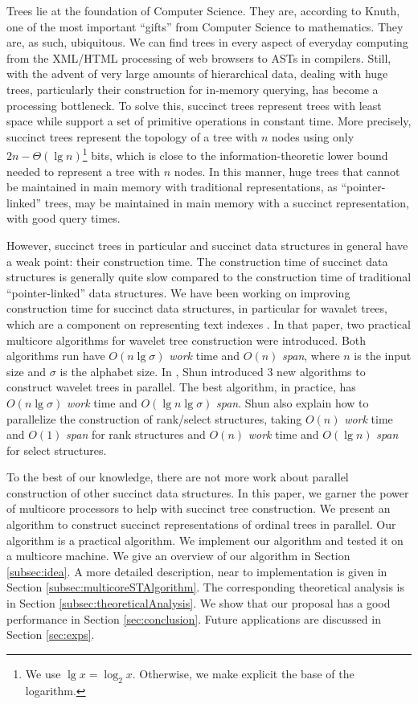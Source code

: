 Trees lie at the foundation of Computer Science. They are, according
to Knuth, one of the most important ``gifts'' from Computer Science to
mathematics. They are, as such, ubiquitous. We can find trees in every
aspect of everyday computing from the XML/HTML processing of web
browsers to ASTs in compilers. Still, with the advent of very large
amounts of hierarchical data, dealing with huge trees, particularly
their construction for in-memory querying, has become a processing
bottleneck. To solve this, succinct trees represent trees with least
space while support a set of primitive operations in constant time.
More precisely, succinct trees represent the topology of a tree with 
$n$ nodes using only $2n-\Theta(\lg n)$\footnote{We use $\lg x = \log_{2}x$. Otherwise, we make explicit the base of the logarithm.} bits, which is close to the
information-theoretic lower bound needed to represent a tree with $n$
nodes. In this manner, huge trees that cannot be maintained in main
memory with traditional representations, as ``pointer-linked'' trees,
may be maintained in main memory with a succinct representation, with good
query times.

However, succinct trees in particular and succinct data structures in general
have a weak point: their construction time. The construction time of succinct
data structures is generally quite slow compared to the construction time of
traditional ``pointer-linked'' data structures. We have been working
on improving construction time for succinct data structures, in particular
for wavalet trees, which are a component on representing text indexes
\cite{Fuentes2014}. In that paper, two practical multicore algorithms
for wavelet tree construction were introduced. Both algorithms run
have $O(n\lg \sigma)$ {\em work} time and $O(n)$ {\em span}, where $n$
is the input size and $\sigma$ is the alphabet size. In
\cite{DBLP:journals/corr/Shun14}, Shun introduced 3 new algorithms to
construct wavelet trees in parallel. The best algorithm, in practice,
has $O(n\lg \sigma)$ {\em work} time and $O(\lg n\lg \sigma)$ {\em
span}. Shun also explain how to parallelize the construction of
rank/select structures, taking $O(n)$ {\em work} time and $O(1)$ {\em
span} for rank structures and $O(n)$ {\em work} time and $O(\lg n)$
{\em span} for select structures.

To the best of our knowledge, there are not more work about parallel
construction of other succinct data structures. In this paper, we garner
the power of multicore processors to help with succinct tree construction.
We present an algorithm to construct succinct representations of ordinal
trees in parallel. Our algorithm is a practical algorithm. We implement
our algorithm and tested it on a multicore machine. We give an overview
of our algorithm in Section \ref{subsec:idea}. A more detailed description,
near to implementation is given in Section \ref{subsec:multicoreSTAlgorithm}.
The corresponding theoretical analysis is in Section \ref{subsec:theoreticalAnalysis}.
We show that our proposal has a good performance in Section \ref{sec:conclusion}. Future
applications are discussed in Section \ref{sec:exps}.
